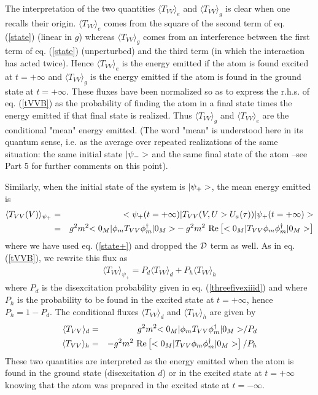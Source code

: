  The interpretation of the two quantities $\langle T_{VV}\rangle _{e}$ and
$\langle T_{VV} \rangle _{g}$ is clear when one
recalls their origin. $\langle T_{VV}\rangle _{e}$
comes from the square of the second term of eq.
(\ref{state}) (linear in $g$) whereas $\langle T_{VV} \rangle _{g}$ comes
from an interference between the first term of eq. (\ref{state})
(unperturbed) and the third term (in which the interaction has acted twice).
Hence $\langle T_{VV}\rangle _{e}$ is the energy emitted
if the atom is found excited at $t=+\infty$ and $\langle T_{VV}\rangle _{g}$
is the energy emitted if the atom
is found in the ground state at $t=+\infty$. These fluxes
have been normalized so as to express
the r.h.s. of eq. (\ref{tVVB})  as the probability of finding the atom in
a final state times the energy
emitted if that final state is realized.
Thus $\langle T_{VV} \rangle _{g}$  and $\langle T_{VV}\rangle _{e}$
are the conditional "mean" energy emitted. (The word "mean"  is understood
here in its quantum sense, i.e. as the average over repeated realizations
of the same situation: the same initial state $\mbox{$ \vert \psi_- > $}$ and the same
final state of the atom --see Part 5 for further comments on this point).

Similarly, when the initial state of the system is $\mbox{$ \vert \psi_+ > $}$,
the mean energy emitted is
\begin{eqnarray}
\langle T_{VV}(V)\rangle _{\psi_+} &=&
\mbox{$ < \psi_+(t=+\infty) \vert $} T_{VV} (V, U>U_a(\tau))\mbox{$ \vert \psi_+
(t=+\infty) > $}
\nonumber\\
&=&
g^2m^2 \mbox{$ < 0_M \vert $} \phi_m  T_{VV} \phi_m^\dagger\mbox{$ \vert 0_M > $}
-  g^2m^2 \mbox{ Re}\left[
\mbox{$ < 0_M \vert $}  T_{VV} \phi_m  \phi_m^\dagger\mbox{$ \vert 0_M > $}
\right]
\label{tVV+}
\end{eqnarray}
where we have used eq. (\ref{state+}) and dropped the $\cal{D}$ term as well.
As in eq. (\ref{tVVB}), we rewrite this flux as
\begin{eqnarray}
\langle T_{VV}\rangle _{\psi_+} = P_d \langle T_{VV} \rangle _{d}
+  P_h \langle T_{VV} \rangle _{h}
\label{tVVB+}
\end{eqnarray}
where $P_d$ is the disexcitation probability given in eq.
(\ref{threefivexiiid})
and where
$P_h$ is
the probability to be found in the excited state at $t=+\infty$, hence
$
P_h =  1- P_d
$.
The conditional fluxes $\langle T_{VV}\rangle _{d}$ and
$\langle T_{VV}\rangle _{h}$ are given by
\begin{eqnarray}
\langle T_{VV}\rangle _{d}
 &=& g^2m^2 \mbox{$ < 0_M \vert $} \phi_m T_{VV} \phi_m^\dagger
\mbox{$ \vert 0_M > $}/ P_d\nonumber\\
\langle T_{VV}\rangle _{h}
&=& - g^2m^2\mbox{ Re}\left[
 \mbox{$ < 0_M \vert $}  T_{VV} \phi_m \phi_m^\dagger \mbox{$ \vert 0_M > $} \right]/ P_h
\label{50b}
\end{eqnarray}
These two quantities
are interpreted as the energy emitted when the atom is found
in the ground state (disexcitation $d$)
or in the excited state at $t=+\infty$ knowing that the atom was prepared
in the
excited state at $t=- \infty$.

